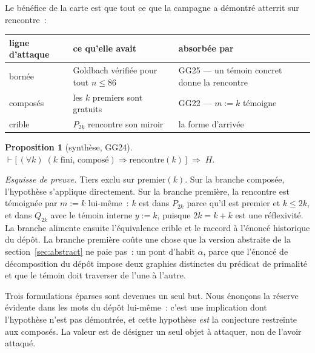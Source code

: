 \documentclass[11pt]{article}
\newtheorem{proposition}{Proposition}
\theoremstyle{remark}\newtheorem{remarque}{Remarque}
\begin{document}
Le bénéfice de la carte est que tout ce que la campagne a démontré atterrit sur
$\mathrm{rencontre}$~:

\begin{center}
\begin{tabular}{@{}lll@{}}
\toprule
ligne d'attaque & ce qu'elle avait & absorbée par \\
\midrule
bornée & Goldbach vérifiée pour tout $n \le 86$ & GG25 --- un témoin concret donne la rencontre \\
composés & les $k$ premiers sont gratuits & GG22 --- $m := k$ témoigne \\
crible & $P_{2k}$ rencontre son miroir & la forme d'arrivée \\
\bottomrule
\end{tabular}
\end{center}

\begin{proposition}[synthèse, GG24]
$\vdash \bigl[\,(\forall k)\;(\text{$k$ fini, composé}) \Rightarrow \mathrm{rencontre}(k)\,\bigr]
\;\Longrightarrow\; H .$
\end{proposition}

\emph{Esquisse de preuve.} Tiers exclu sur $\mathrm{premier}(k)$. Sur la branche
composée, l'hypothèse s'applique directement. Sur la branche première, la rencontre est
témoignée par $m := k$ lui-même~: $k$ est dans $P_{2k}$ parce qu'il est premier et
$k \le 2k$, et dans $Q_{2k}$ avec le témoin interne $y := k$, puisque $2k = k + k$ est
une réflexivité. La branche alimente ensuite l'équivalence crible et le raccord à
l'énoncé historique du dépôt. La branche première coûte une chose que la version
abstraite de la section~\ref{sec:abstract} ne paie pas~: un pont d'habit $\alpha$, parce
que l'énoncé de décomposition du dépôt impose deux graphies distinctes du prédicat de
primalité et que le témoin doit traverser de l'une à l'autre.

Trois formulations éparses sont devenues un seul but. Nous énonçons la réserve évidente
dans les mots du dépôt lui-même~: c'est une implication dont l'hypothèse n'est pas
démontrée, et cette hypothèse \emph{est} la conjecture restreinte aux composés. La valeur
est de désigner un seul objet à attaquer, non de l'avoir attaqué.
\end{document}

